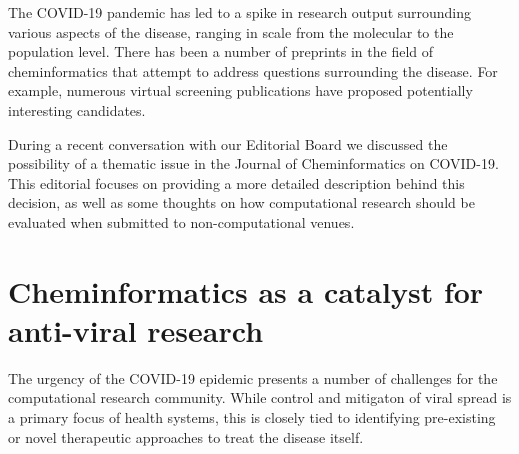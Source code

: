 \documentclass{bmcart}
\begin{document}






The COVID-19 pandemic has led to a spike in research output
surrounding various aspects of the disease, ranging in scale from the
molecular to the population level.  There has been a
number of preprints in the field of cheminformatics that attempt to
address questions surrounding the disease. For example, numerous
virtual screening publications have proposed potentially interesting
candidates. 

During a recent conversation with our Editorial Board we discussed the
possibility of a thematic issue in the Journal of Cheminformatics on
COVID-19. This editorial focuses on providing a more detailed
description behind this decision, as well as some thoughts on how
computational research should be evaluated when submitted to
non-computational venues.

\section*{Cheminformatics as a catalyst for anti-viral research}

The urgency of the COVID-19 epidemic presents a number of challenges
for the computational research community. While control and mitigaton of viral
spread is a primary focus of health systems, this is closely tied to
identifying pre-existing or novel therapeutic approaches to treat the
disease itself.
\end{document}
